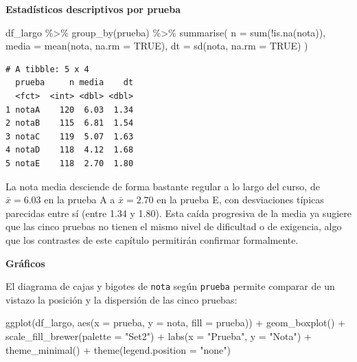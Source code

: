 \documentclass[
  spanish,
  a4paper,
]{scrreport}
\newenvironment{Shaded}{\begin{snugshade}}{\end{snugshade}}
\newcommand{\AttributeTok}[1]{\textcolor[rgb]{0.40,0.45,0.13}{#1}}
\newcommand{\ConstantTok}[1]{\textcolor[rgb]{0.56,0.35,0.01}{#1}}
\newcommand{\FunctionTok}[1]{\textcolor[rgb]{0.28,0.35,0.67}{#1}}
\newcommand{\NormalTok}[1]{\textcolor[rgb]{0.00,0.23,0.31}{#1}}
\newcommand{\SpecialCharTok}[1]{\textcolor[rgb]{0.37,0.37,0.37}{#1}}
\newcommand{\StringTok}[1]{\textcolor[rgb]{0.13,0.47,0.30}{#1}}
\newcounter{none} %
\theoremstyle{definition}
\theoremstyle{definition}
\theoremstyle{remark}
\begin{document}
\textbf{Estadísticos descriptivos por prueba}

\begin{Shaded}
\begin{Highlighting}[]
\NormalTok{df\_largo }\SpecialCharTok{\%\textgreater{}\%}
  \FunctionTok{group\_by}\NormalTok{(prueba) }\SpecialCharTok{\%\textgreater{}\%}
  \FunctionTok{summarise}\NormalTok{(}
    \AttributeTok{n =} \FunctionTok{sum}\NormalTok{(}\SpecialCharTok{!}\FunctionTok{is.na}\NormalTok{(nota)),}
    \AttributeTok{media =} \FunctionTok{mean}\NormalTok{(nota, }\AttributeTok{na.rm =} \ConstantTok{TRUE}\NormalTok{),}
    \AttributeTok{dt =} \FunctionTok{sd}\NormalTok{(nota, }\AttributeTok{na.rm =} \ConstantTok{TRUE}\NormalTok{)}
\NormalTok{  )}
\end{Highlighting}
\end{Shaded}

\begin{verbatim}
# A tibble: 5 x 4
  prueba     n media    dt
  <fct>  <int> <dbl> <dbl>
1 notaA    120  6.03  1.34
2 notaB    115  6.81  1.54
3 notaC    119  5.07  1.63
4 notaD    118  4.12  1.68
5 notaE    118  2.70  1.80
\end{verbatim}

La nota media desciende de forma bastante regular a lo largo del curso,
de \(\bar{x}=6.03\) en la prueba A a \(\bar{x}=2.70\) en la prueba E,
con desviaciones típicas parecidas entre sí (entre 1.34 y 1.80). Esta
caída progresiva de la media ya sugiere que las cinco pruebas no tienen
el mismo nivel de dificultad o de exigencia, algo que los contrastes de
este capítulo permitirán confirmar formalmente.

\textbf{Gráficos}

El diagrama de cajas y bigotes de \texttt{nota} según \texttt{prueba}
permite comparar de un vistazo la posición y la dispersión de las cinco
pruebas:

\begin{Shaded}
\begin{Highlighting}[]
\FunctionTok{ggplot}\NormalTok{(df\_largo, }\FunctionTok{aes}\NormalTok{(}\AttributeTok{x =}\NormalTok{ prueba, }\AttributeTok{y =}\NormalTok{ nota, }\AttributeTok{fill =}\NormalTok{ prueba)) }\SpecialCharTok{+}
  \FunctionTok{geom\_boxplot}\NormalTok{() }\SpecialCharTok{+}
  \FunctionTok{scale\_fill\_brewer}\NormalTok{(}\AttributeTok{palette =} \StringTok{"Set2"}\NormalTok{) }\SpecialCharTok{+}
  \FunctionTok{labs}\NormalTok{(}\AttributeTok{x =} \StringTok{"Prueba"}\NormalTok{, }\AttributeTok{y =} \StringTok{"Nota"}\NormalTok{) }\SpecialCharTok{+}
  \FunctionTok{theme\_minimal}\NormalTok{() }\SpecialCharTok{+}
  \FunctionTok{theme}\NormalTok{(}\AttributeTok{legend.position =} \StringTok{"none"}\NormalTok{)}
\end{Highlighting}
\end{Shaded}
\end{document}

